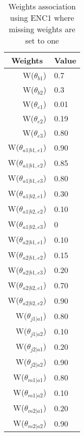 \begin{table}[]
\centering
\caption{Weights association using ENC1 where missing weights are set to one}
\label{weightsEnc1}
\begin{tabular}{rl}
\hline
\multicolumn{1}{c}{Weights} & \multicolumn{1}{c}{Value} \\ \hline
W(\(\theta_{b1}\)) & 0.7 \\ 
W(\(\theta_{b2}\)) & 0.3 \\ 
W(\(\theta_{e1}\)) & 0.01 \\ 
W(\(\theta_{e2}\)) & 0.19 \\ 
W(\(\theta_{e3}\)) & 0.80 \\ 
W(\(\theta_{a1|b1,e1}\)) & 0.90 \\
W(\(\theta_{a1|b1,e2}\)) & 0.85 \\
W(\(\theta_{a1|b1,e3}\)) & 0.80 \\
W(\(\theta_{a1|b2,e1}\)) & 0.30 \\
W(\(\theta_{a1|b2,e2}\)) & 0.10 \\
W(\(\theta_{a1|b2,e3}\)) & 0 \\
W(\(\theta_{a2|b1,e1}\)) & 0.10 \\
W(\(\theta_{a2|b1,e2}\)) & 0.15 \\
W(\(\theta_{a2|b1,e3}\)) & 0.20 \\
W(\(\theta_{a2|b2,e1}\)) & 0.70 \\
W(\(\theta_{a2|b2,e2}\)) & 0.90 \\
W(\(\theta_{j1|a1}\)) & 0.80 \\
W(\(\theta_{j1|a2}\)) & 0.10 \\
W(\(\theta_{j2|a1}\)) & 0.20 \\
W(\(\theta_{j2|a2}\)) & 0.90 \\
W(\(\theta_{m1|a1}\)) & 0.80 \\
W(\(\theta_{m1|a2}\)) & 0.10 \\
W(\(\theta_{m2|a1}\)) & 0.20 \\
W(\(\theta_{m2|a2}\)) & 0.90
\end{tabular}
\end{table}